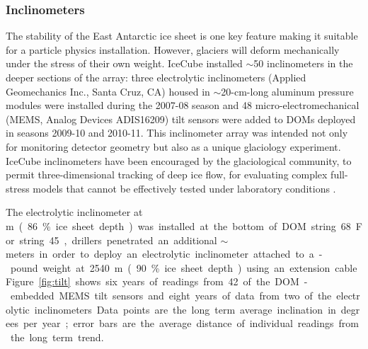 \subsubsection{Inclinometers}

The stability of the East Antarctic ice sheet is one key feature making it suitable for a particle physics installation.  However, glaciers will deform mechanically under the stress of their own weight.  IceCube installed $\sim$50 inclinometers in the deeper sections of the array:  three electrolytic inclinometers (Applied Geomechanics Inc., Santa Cruz, CA) housed in $\sim$20-cm-long aluminum pressure modules were installed during the 2007-08 season and 48 micro-electromechanical (MEMS, Analog Devices ADIS16209) tilt sensors were added to DOMs deployed in seasons 2009-10 and 2010-11.  This inclinometer array was intended not only for monitoring detector geometry but also as a unique glaciology experiment.  IceCube inclinometers have been encouraged by the glaciological community, to permit three-dimensional tracking of deep ice flow, for evaluating complex full-stress models that cannot be effectively tested under laboratory conditions \cite{pattyn03}.

The electrolytic inclinometer at \unit[2455]m (86\% ice sheet depth) was installed at the bottom of DOM string 68.  For string 45, drillers penetrated an additional $\sim$\unit[100]meters in order to deploy an electrolytic inclinometer attached to a \unit[100]-pound weight at 2540 m (90\% ice sheet depth) using an extension cable.  Figure \ref{fig:tilt} shows six years of readings from 42 of the DOM-embedded MEMS tilt sensors and eight years of data from two of the electrolytic inclinometers.  Data points are the long term average inclination in degrees per year; error bars are the average distance of individual readings from the long term trend.


